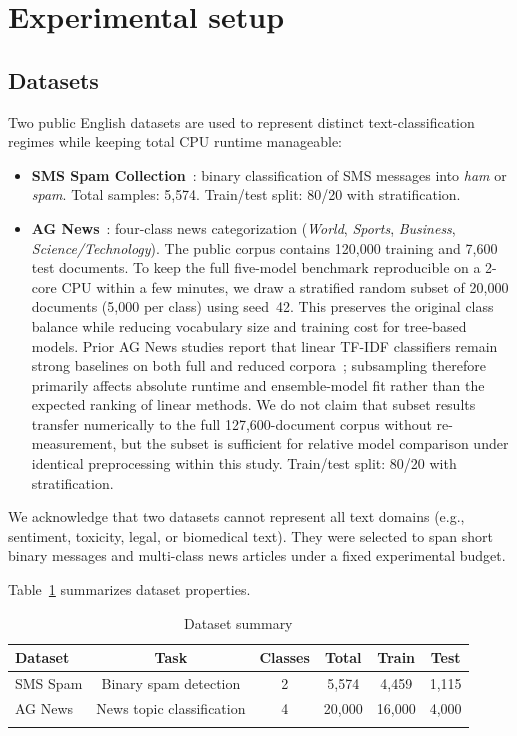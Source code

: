 \documentclass[pdflatex,sn-mathphys-num]{sn-jnl}
\begin{document}
\section{Experimental setup}\label{sec:setup}

\subsection{Datasets}

Two public English datasets are used to represent distinct text-classification regimes while keeping total CPU runtime manageable:
\begin{itemize}
    \item \textbf{SMS Spam Collection}~\cite{almeida2011sms}: binary classification of SMS messages into \textit{ham} or \textit{spam}. Total samples: 5{,}574. Train/test split: 80/20 with stratification.
    \item \textbf{AG News}~\cite{zhang2015character}: four-class news categorization (\textit{World}, \textit{Sports}, \textit{Business}, \textit{Science/Technology}). The public corpus contains 120{,}000 training and 7{,}600 test documents. To keep the full five-model benchmark reproducible on a 2-core CPU within a few minutes, we draw a stratified random subset of 20{,}000 documents (5{,}000 per class) using seed~42. This preserves the original class balance while reducing vocabulary size and training cost for tree-based models. Prior AG News studies report that linear TF-IDF classifiers remain strong baselines on both full and reduced corpora~\cite{zhang2015character,wang2024atcbench}; subsampling therefore primarily affects absolute runtime and ensemble-model fit rather than the expected ranking of linear methods. We do not claim that subset results transfer numerically to the full 127{,}600-document corpus without re-measurement, but the subset is sufficient for relative model comparison under identical preprocessing within this study. Train/test split: 80/20 with stratification.
\end{itemize}

We acknowledge that two datasets cannot represent all text domains (e.g., sentiment, toxicity, legal, or biomedical text). They were selected to span short binary messages and multi-class news articles under a fixed experimental budget.

Table~\ref{tab:datasets} summarizes dataset properties.

\begin{table}[t]
\caption{Dataset summary}\label{tab:datasets}
\begin{tabular}{@{}lccccc@{}}
\toprule
Dataset & Task & Classes & Total & Train & Test \\
\midrule
SMS Spam & Binary spam detection & 2 & 5{,}574 & 4{,}459 & 1{,}115 \\
AG News & News topic classification & 4 & 20{,}000 & 16{,}000 & 4{,}000 \\
\botrule
\end{tabular}
\end{table}
\end{document}
